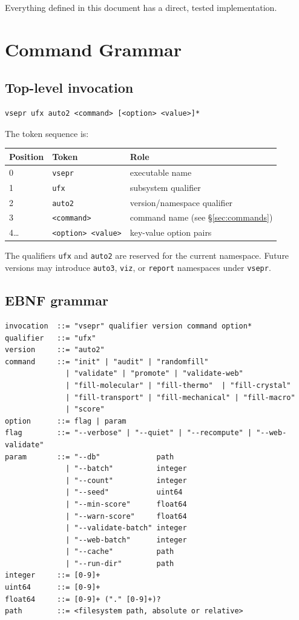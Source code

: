 \documentclass[11pt,letterpaper]{article}
\begin{document}
Everything defined in this document has a direct, tested implementation.

\section{Command Grammar}

\subsection{Top-level invocation}

\begin{lstlisting}
vsepr ufx auto2 <command> [<option> <value>]*
\end{lstlisting}

The token sequence is:

\begin{center}
\begin{tabular}{lll}
\toprule
Position & Token & Role \\
\midrule
0 & \texttt{vsepr} & executable name \\
1 & \texttt{ufx} & subsystem qualifier \\
2 & \texttt{auto2} & version/namespace qualifier \\
3 & \texttt{<command>} & command name (see \S\ref{sec:commands}) \\
4\ldots & \texttt{<option> <value>} & key-value option pairs \\
\bottomrule
\end{tabular}
\end{center}

The qualifiers \texttt{ufx} and \texttt{auto2} are reserved for the current
namespace.  Future versions may introduce \texttt{auto3}, \texttt{viz}, or
\texttt{report} namespaces under \texttt{vsepr}.

\subsection{EBNF grammar}

\begin{lstlisting}[language={}]
invocation  ::= "vsepr" qualifier version command option*
qualifier   ::= "ufx"
version     ::= "auto2"
command     ::= "init" | "audit" | "randomfill"
			  | "validate" | "promote" | "validate-web"
			  | "fill-molecular" | "fill-thermo"  | "fill-crystal"
			  | "fill-transport" | "fill-mechanical" | "fill-macro"
			  | "score"
option      ::= flag | param
flag        ::= "--verbose" | "--quiet" | "--recompute" | "--web-validate"
param       ::= "--db"             path
			  | "--batch"          integer
			  | "--count"          integer
			  | "--seed"           uint64
			  | "--min-score"      float64
			  | "--warn-score"     float64
			  | "--validate-batch" integer
			  | "--web-batch"      integer
			  | "--cache"          path
			  | "--run-dir"        path
integer     ::= [0-9]+
uint64      ::= [0-9]+
float64     ::= [0-9]+ ("." [0-9]+)?
path        ::= <filesystem path, absolute or relative>
\end{lstlisting}
\end{document}

